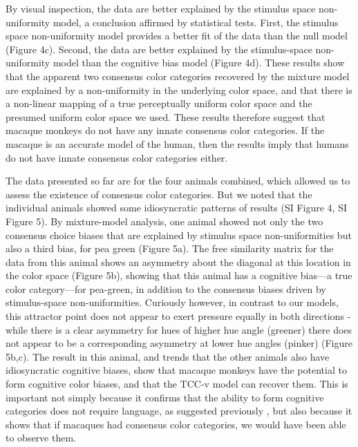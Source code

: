 \documentclass[9pt,biorxiv,lineno,onehalfspacing]{lapreprint}
\begin{document}
\begin{refsection}
By visual inspection, the data are better explained by the stimulus space non-uniformity model, a conclusion affirmed by statistical tests. 
First, the stimulus space non-uniformity model provides a better fit of the data than the null model (Figure 4c). 
Second, the data are better explained by the stimulus-space non-uniformity model than the cognitive bias model (Figure 4d). 
These results show that the apparent two consensus color categories recovered by the mixture model are explained by a non-uniformity in the underlying color space, and that there is a non-linear mapping of a true perceptually uniform color space and the presumed uniform color space we used. 
These results therefore suggest that macaque monkeys do not have any innate consensus color categories. 
If the macaque is an accurate model of the human, then the results imply that humans do not have innate consensus color categories either. 

The data presented so far are for the four animals combined, which allowed us to assess the existence of consensus color categories. 
But we noted that the individual animals showed some idiosyncratic patterns of results (SI Figure 4, SI Figure 5). 
By mixture-model analysis, one animal showed not only the two consensus choice biases that are explained by stimulus space non-uniformities but also a third bias, for pea green (Figure 5a). 
The free similarity matrix for the data from this animal shows an asymmetry about the diagonal at this location in the color space (Figure 5b), showing that this animal has a cognitive bias---a true color category---for pea-green, in addition to the consensus biases driven by stimulus-space non-uniformities. 
Curiously however, in contrast to our models, this attractor point does not appear to exert pressure equally in both directions - while there is a clear asymmetry for hues of higher hue angle (greener) there does not appear to be a corresponding asymmetry at lower hue angles (pinker) (Figure 5b,c).
The result in this animal, and trends that the other animals also have idiosyncratic cognitive biases, show that macaque monkeys have the potential to form cognitive color biases, and that the TCC-v model can recover them. 
This is important not simply because it confirms that the ability to form cognitive categories does not require language, as suggested previously \citep{panichello_error-correcting_2019}, but also because it shows that if macaques had consensus color categories, we would have been able to observe them.



\end{refsection}
\end{document}
